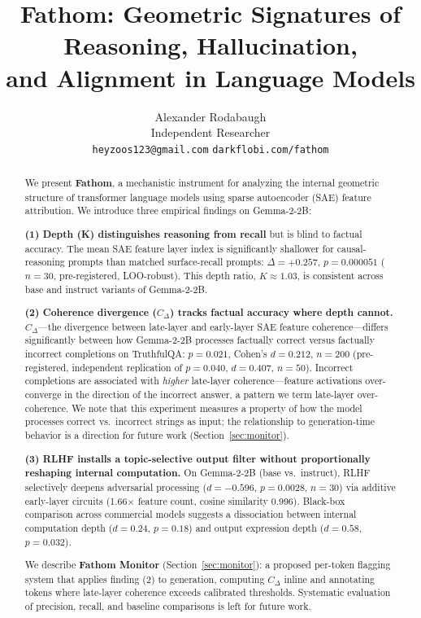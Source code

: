\documentclass[10pt]{article}
\title{Fathom: Geometric Signatures of Reasoning, Hallucination,\\and Alignment in Language Models}
\author{
  Alexander Rodabaugh \\
  Independent Researcher \\
  \texttt{heyzoos123@gmail.com} \quad \texttt{darkflobi.com/fathom}
}
\date{}
\begin{document}
\maketitle

\begin{abstract}
We present \textbf{Fathom}, a mechanistic instrument for analyzing the internal geometric structure of transformer language models using sparse autoencoder (SAE) feature attribution. We introduce three empirical findings on Gemma-2-2B:

\textbf{(1) Depth (K) distinguishes reasoning from recall} but is blind to factual accuracy. The mean SAE feature layer index is significantly shallower for causal-reasoning prompts than matched surface-recall prompts: $\Delta = +0.257$, $p = 0.000051$ ($n = 30$, pre-registered, LOO-robust). This depth ratio, $K \approx 1.03$, is consistent across base and instruct variants of Gemma-2-2B.

\textbf{(2) Coherence divergence ($C_{\Delta}$) tracks factual accuracy where depth cannot.} $C_{\Delta}$---the divergence between late-layer and early-layer SAE feature coherence---differs significantly between how Gemma-2-2B processes factually correct versus factually incorrect completions on TruthfulQA: $p = 0.021$, Cohen's $d = 0.212$, $n = 200$ (pre-registered, independent replication of $p = 0.040$, $d = 0.407$, $n = 50$). Incorrect completions are associated with \textit{higher} late-layer coherence---feature activations over-converge in the direction of the incorrect answer, a pattern we term late-layer over-coherence. We note that this experiment measures a property of how the model processes correct vs.\ incorrect strings as input; the relationship to generation-time behavior is a direction for future work (Section~\ref{sec:monitor}).

\textbf{(3) RLHF installs a topic-selective output filter without proportionally reshaping internal computation.} On Gemma-2-2B (base vs.\ instruct), RLHF selectively deepens adversarial processing ($d = -0.596$, $p = 0.0028$, $n = 30$) via additive early-layer circuits (1.66$\times$ feature count, cosine similarity 0.996). Black-box comparison across commercial models suggests a dissociation between internal computation depth ($d = 0.24$, $p = 0.18$) and output expression depth ($d = 0.58$, $p = 0.032$).

We describe \textbf{Fathom Monitor} (Section~\ref{sec:monitor}): a proposed per-token flagging system that applies finding (2) to generation, computing $C_{\Delta}$ inline and annotating tokens where late-layer coherence exceeds calibrated thresholds. Systematic evaluation of precision, recall, and baseline comparisons is left for future work.
\end{abstract}
\end{document}
